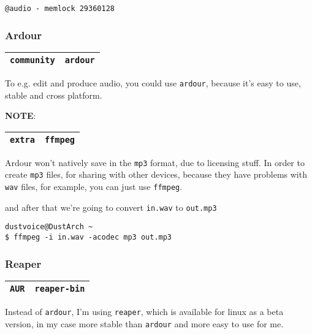 \documentclass[9pt]{report}
\newcommand{\admonition}[2]{\textbf{#1}: {#2}}
\begin{document}
\begin{verbatim}
@audio - memlock 29360128
\end{verbatim}

\hypertarget{x-ardour}{\subsubsection{Ardour}}
\begin{center}
\begin{tabular}{|c|c|}
\hline
\texttt{community} & \texttt{ardour} \\ 
\hline
\end{tabular}
\end{center}

To e.g. edit and produce audio, you could use \texttt{ardour}, because it’s easy to use, stable and cross platform.


\admonition{NOTE}{\begin{center}
\begin{tabular}{|c|c|}
\hline
\texttt{extra} & \texttt{ffmpeg} \\ 
\hline
\end{tabular}
\end{center}

Ardour won’t natively save in the \texttt{mp3} format, due to licensing stuff.
In order to create \texttt{mp3} files, for sharing with other devices, because they have problems with \texttt{wav} files, for example, you can just use \texttt{ffmpeg}.


and after that we’re going to convert \texttt{in.wav} to \texttt{out.mp3}


}
\begin{verbatim}
dustvoice@DustArch ~
$ ffmpeg -i in.wav -acodec mp3 out.mp3
\end{verbatim}
\hypertarget{x-reaper}{\subsubsection{Reaper}}
\begin{center}
\begin{tabular}{|c|c|}
\hline
\texttt{AUR} & \texttt{reaper-bin} \\ 
\hline
\end{tabular}
\end{center}

Instead of \texttt{ardour}, I’m using \texttt{reaper}, which is available for linux as a beta version, in my case more stable than \texttt{ardour} and more easy to use for me.
\end{document}
